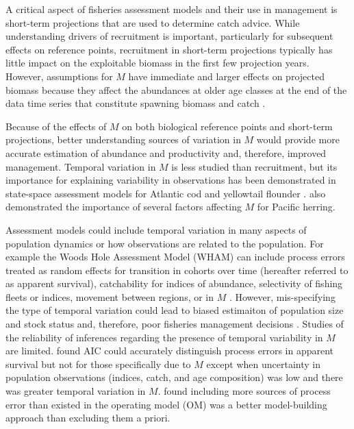 \documentclass[
  12pt,
]{article}
\begin{document}
A critical aspect of fisheries assessment models and their use in management is short-term projections that are used to determine catch advice. While understanding drivers of recruitment is important, particularly for subsequent effects on reference points, recruitment in short-term projections typically has little impact on the exploitable biomass in the first few projection years. However, assumptions for \(M\) have immediate and larger effects on projected biomass because they affect the abundances at older age classes at the end of the data time series that constitute spawning biomass and catch \citep{brodziaketal08, stocketal21}.

Because of the effects of \(M\) on both biological reference points and short-term projections, better understanding sources of variation in \(M\) would provide more accurate estimation of abundance and productivity and, therefore, improved management. Temporal variation in \(M\) is less studied than recruitment, but its importance for explaining variability in observations has been demonstrated in state-space assessment models for Atlantic cod and yellowtail flounder \citep{cadigan16, stocketal21}. \citet{derisoetal08} also demonstrated the importance of several factors affecting \(M\) for Pacific herring.

Assessment models could include temporal variation in many aspects of population dynamics or how observations are related to the population. For example the Woods Hole Assessment Model (WHAM) can include process errors treated as random effects for transition in cohorts over time (hereafter referred to as apparent survival), catchability for indices of abundance, selectivity of fishing fleets or indices, movement between regions, or in \(M\) \citep{stockmiller21, milleretal25}. However, mis-specifying the type of temporal variation could lead to biased estimaiton of population size and stock status and, therefore, poor fisheries management decisions \citep{legaultpalmer16, szuwalskietal18}. Studies of the reliability of inferences regarding the presence of temporal variability in \(M\) are limited. \citet{milleretal_inreview1} found AIC could accurately distinguish process errors in apparent survival but not for those specifically due to \(M\) except when uncertainty in population observations (indices, catch, and age composition) was low and there was greater temporal variation in \(M\). \citet{lietal24} found including more sources of process error than existed in the operating model (OM) was a better model-building approach than excluding them a priori.
\end{document}
